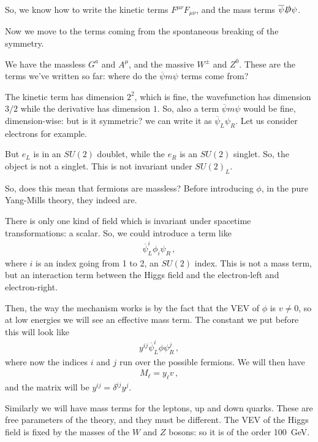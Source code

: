 \documentclass[main.tex]{subfiles}
\begin{document}
So, we know how to write the kinetic terms \(F^{\mu \nu } F_{\mu \nu }\), and the mass terms \(\overline{\psi} \slashed{D} \psi \). 

Now we move to the terms coming from the spontaneous breaking of the symmetry. 

We have the massless \(G^{a}\) and \(A^{\mu }\), and the massive \(W^{\pm}\) and \(Z^{0}\). These are the terms we've written so far: where do the \(\overline{\psi} m  \psi \) terms come from?

The kinetic term has dimension \(2^2\), which is fine, the wavefunction has dimension \(3/2\) while the derivative has dimension \(1\).
So, also a term \(\overline{\psi} m \psi \) would be fine, dimension-wise: but is it symmetric? we can write it as \(\overline{\psi}_{L} \psi_{R}\). Let us consider electrons for example.

But \(e_L\) is in an \(SU(2)\) doublet, while the \(e_R\) is an \(SU(2)\) singlet. So, the object is not a singlet. This is not invariant under \(SU(2)_{L}\).

So, does this mean that fermions are massless? Before introducing \(\phi \), in the pure Yang-Mills theory, they indeed are.

There is only one kind of field which is invariant under spacetime transformations: a scalar. So, we could introduce a term like 
%
\begin{align}
\overline{\psi}_{L}^{i} \phi_{i} \psi_{R}
\,,
\end{align}
%
where \(i\) is an index going from 1 to 2, an \(SU(2)\) index. 
This is not a mass term, but an interaction term between the Higgs field and the electron-left and electron-right.

Then, the way the mechanism works is by the fact that the VEV of \(\phi \) is \(v \neq 0\), so at low energies we will see an effective mass term. The constant we put before this will look like 
%
\begin{align}
y^{ij} \overline{\psi}^{i}_{L} \phi \psi_{R}^{j}
\,,
\end{align}
%
where now the indices \(i\) and \(j\) run over the possible fermions.
We will then have 
%
\begin{align}
M_\ell = y_{\ell} v 
\,,
\end{align}
%
and the matrix will be \(y^{ij} = \delta^{ij} y^{j}\).

Similarly we will have mass terms for the leptons, up and down quarks.
These are free parameters of the theory, and they must be different. 
The VEV of the Higgs field is fixed by the masses of the \(W\) and \(Z\) bosons: so it is of the order \SI{100}{GeV}.
\end{document}
